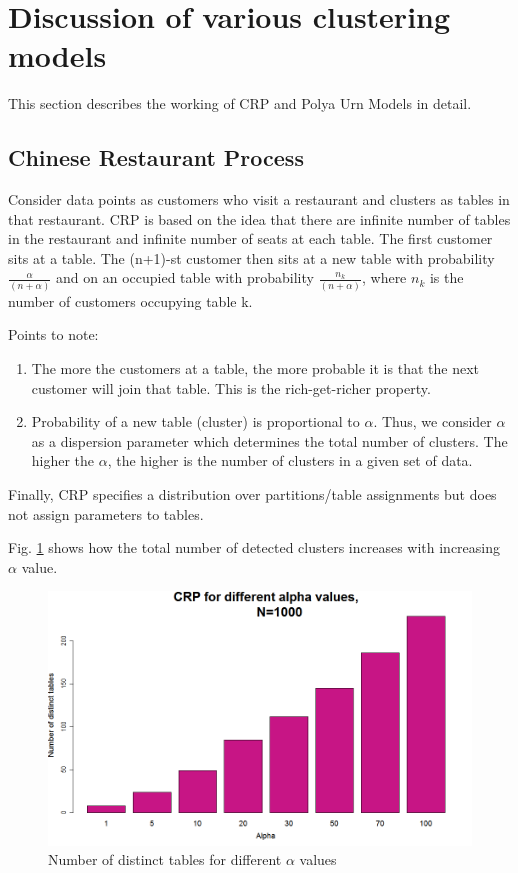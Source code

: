 \documentclass{article} %
\begin{document}
\section{Discussion of various clustering models}
This section describes the working of CRP and Polya Urn Models in detail.
\subsection{Chinese Restaurant Process}
Consider data points as customers who visit a restaurant and clusters as tables in that restaurant. CRP is based on the idea that there are infinite number of tables in the restaurant and infinite number of seats at each table. The first customer sits at a table. The (n+1)-st customer then sits at a new table with probability $\frac{\alpha}{(n+\alpha)}$ and on an occupied table with probability $\frac{n_k}{(n+\alpha)}$, where $n_k$ is the number of customers occupying table k.

Points to note:
\begin{enumerate}
\item The more the customers at a table, the more probable it is that the next customer will join that table. This is the rich-get-richer property.
\item Probability of a new table (cluster) is proportional to $\alpha$. Thus, we consider $\alpha$ as a dispersion parameter which determines the total number of clusters. The higher the $\alpha$, the higher is the number of clusters in a given set of data.
\end{enumerate}
Finally, CRP specifies a distribution over partitions/table assignments but does not assign parameters to tables.

Fig. \ref{fig:crp} shows how the total number of detected clusters increases with increasing $\alpha$ value.
\begin{figure}[h]
\begin{center}
\includegraphics[width=.5\linewidth]{plots/crp.png}
\caption{Number of distinct tables for different $\alpha$ values}
\label{fig:crp}
\end{center}
\end{figure}
\end{document}

